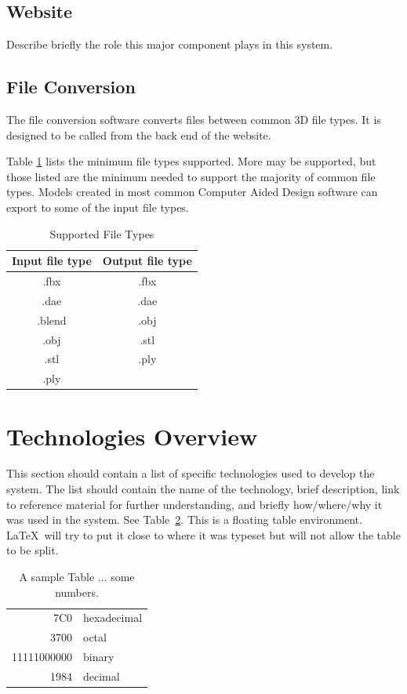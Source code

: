 \subsection{Website}
Describe briefly the role this major component plays in this system. 

\subsection{File Conversion}
The file conversion software converts files between common 3D file types.  It is designed to 
be called from the back end of the website.

Table \ref{table:suportedfiletypes} lists the minimum file types supported.  More may be supported, but those listed are the minimum needed to support the majority of common file types.  
Models created in most common Computer Aided Design software can export to some of the input file types.

\begin{table}[!h]
    \centering
    \begin{tabular}{| c | c |}
        \hline
        Input file type & Output file type \\
        \hline
        .fbx & .fbx \\
        .dae & .dae \\
        .blend & .obj \\ 
        .obj & .stl \\
        .stl & .ply \\
        .ply & \\
        \hline
    \end{tabular}
    \caption{Supported File Types}
    \label{table:suportedfiletypes}
\end{table}

\section{Technologies Overview}
This section should contain a list of specific technologies used to
develop the system.  The list should contain the name of the
technology, brief description, link to reference material for further
understanding, and briefly how/where/why it was used in the system.
See Table~\ref{somenumbers}.  This is a floating table environment.
\LaTeX\ will try to put it close to where it was typeset but will not
allow the table to be split.

\begin{table}[tbh]
\caption{A sample Table ... some numbers. \label{somenumbers}}
\begin{center}
\begin{tabular}{|r|l|}
  \hline
  7C0 & hexadecimal \\
  3700 & octal \\ \cline{2-2}
  11111000000 & binary \\
  \hline \hline
  1984 & decimal \\
  \hline
\end{tabular}
\end{center}
\end{table}


